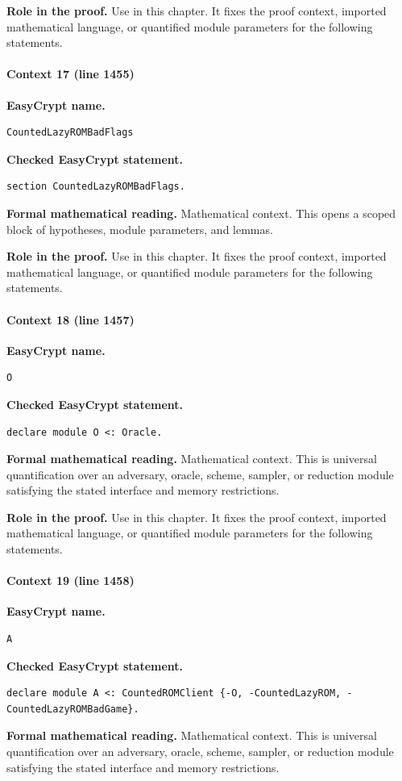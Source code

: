 \noindent\textbf{Role in the proof.}
Use in this chapter. It fixes the proof context, imported mathematical language, or quantified module parameters for the following statements.

\paragraph{Context 17 (line 1455)}
\noindent\textbf{EasyCrypt name.}
\begin{lstlisting}[language=EasyCrypt,basicstyle=\ttfamily\scriptsize]
CountedLazyROMBadFlags
\end{lstlisting}
\noindent\textbf{Checked EasyCrypt statement.}
\begin{lstlisting}[language=EasyCrypt,basicstyle=\ttfamily\scriptsize]
section CountedLazyROMBadFlags.
\end{lstlisting}
\noindent\textbf{Formal mathematical reading.}
Mathematical context. This opens a scoped block of hypotheses, module parameters, and lemmas.

\noindent\textbf{Role in the proof.}
Use in this chapter. It fixes the proof context, imported mathematical language, or quantified module parameters for the following statements.

\paragraph{Context 18 (line 1457)}
\noindent\textbf{EasyCrypt name.}
\begin{lstlisting}[language=EasyCrypt,basicstyle=\ttfamily\scriptsize]
O
\end{lstlisting}
\noindent\textbf{Checked EasyCrypt statement.}
\begin{lstlisting}[language=EasyCrypt,basicstyle=\ttfamily\scriptsize]
declare module O <: Oracle.
\end{lstlisting}
\noindent\textbf{Formal mathematical reading.}
Mathematical context. This is universal quantification over an adversary, oracle, scheme, sampler, or reduction module satisfying the stated interface and memory restrictions.

\noindent\textbf{Role in the proof.}
Use in this chapter. It fixes the proof context, imported mathematical language, or quantified module parameters for the following statements.

\paragraph{Context 19 (line 1458)}
\noindent\textbf{EasyCrypt name.}
\begin{lstlisting}[language=EasyCrypt,basicstyle=\ttfamily\scriptsize]
A
\end{lstlisting}
\noindent\textbf{Checked EasyCrypt statement.}
\begin{lstlisting}[language=EasyCrypt,basicstyle=\ttfamily\scriptsize]
declare module A <: CountedROMClient {-O, -CountedLazyROM, -CountedLazyROMBadGame}.
\end{lstlisting}
\noindent\textbf{Formal mathematical reading.}
Mathematical context. This is universal quantification over an adversary, oracle, scheme, sampler, or reduction module satisfying the stated interface and memory restrictions.


